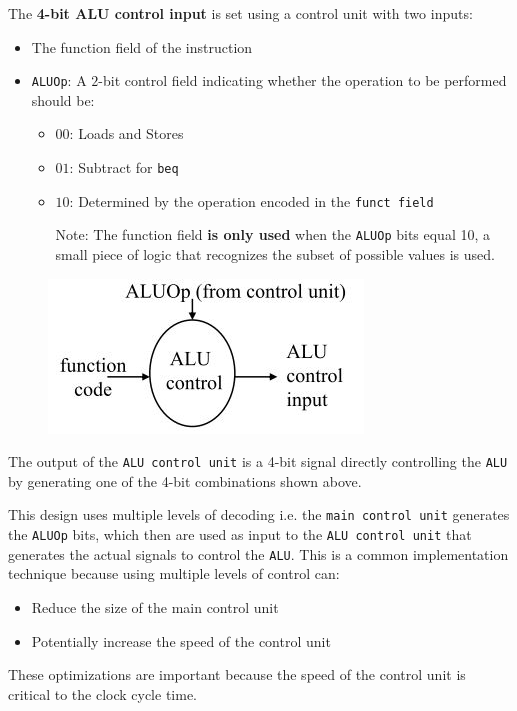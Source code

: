\documentclass[10pt,a4paper]{article}
\begin{document}
The \textbf{4-bit ALU control input} is set using a control unit with two inputs:
\begin{itemize}
    \item The function field of the instruction
    \item \texttt{ALUOp}: A $2$-bit control field indicating whether the operation to be performed should be:
    \begin{itemize}
        \item $00$: Loads and Stores
        \item $01$: Subtract for \texttt{beq}
        \item $10$: Determined by the operation encoded in the \texttt{funct field}
        
        Note: The function field \textbf{is only used} when the \texttt{ALUOp} bits equal 10, a small piece
        of logic that recognizes the subset of possible values is used.
    \end{itemize}
\end{itemize} 

\begin{figure} [h!]
    \centering
    \includegraphics[scale=0.7]{ALU diagram.JPG}
\end{figure}

The output of the \texttt{ALU control unit} is a 4-bit signal directly controlling the \texttt{ALU}
by generating one of the 4-bit combinations shown above.

This design uses multiple levels of decoding i.e. the \texttt{main control unit} generates the
\texttt{ALUOp} bits, which then are used as input to the \texttt{ALU control unit} that generates the actual
signals to control the \texttt{ALU}. This is a common implementation technique because using multiple levels of control can:
\begin{itemize}
    \item Reduce the size of the main control unit
    \item Potentially increase the speed of the control unit
\end{itemize} 
These optimizations are important because the speed of the control unit is critical to the clock cycle time.
\end{document}
